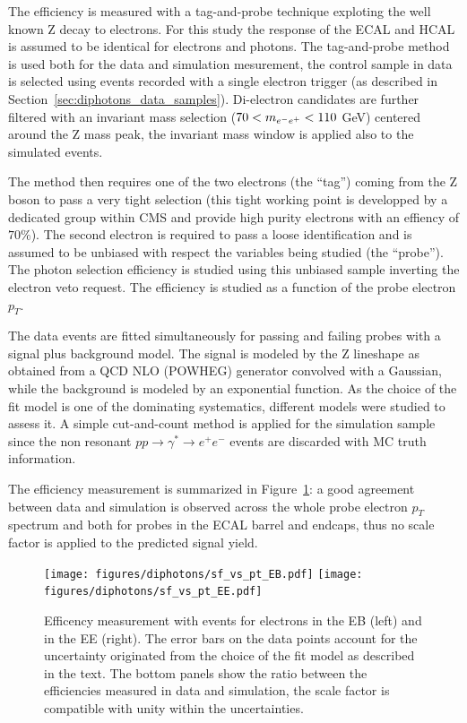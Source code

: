 The efficiency is measured with a tag-and-probe technique exploting the well known Z decay to electrons.
For this study the response of the ECAL and HCAL is assumed to be identical for electrons and photons.
The tag-and-probe method is used both for the data and simulation mesurement, the \Zee control sample
in data is selected using events recorded with a single electron trigger (as described in Section~\ref{sec:diphotons_data_samples}).
Di-electron candidates
are further filtered with an invariant mass selection ($70 < m_{e^-e^+} < 110$ GeV) centered around the Z mass peak,
the invariant mass window is applied also to the simulated events.

The method then requires one of the two electrons (the ``tag'') coming from the Z boson to pass a very tight selection
(this tight working point is developped by a dedicated group within CMS and provide high purity electrons
with an effiency of $70\%$).
The second electron is required to pass a loose identification and is assumed to be unbiased
with respect the variables being studied (the ``probe''). The photon selection efficiency is studied using
this unbiased sample inverting the electron veto request.
The efficiency is studied as a function of the probe electron $p_T$.

The data  events are fitted
simultaneously for passing and failing probes with a signal plus background model.
The signal is modeled by the Z lineshape as obtained from a QCD NLO (POWHEG)
generator convolved with a Gaussian, while the background is modeled by an exponential function. As
the choice of the fit model is one of the dominating systematics, different models were
studied to assess it. A simple cut-and-count method is applied for the simulation sample
since the non resonant $pp \to \gamma^* \to e^+e^-$ events are discarded with MC truth information.

The efficiency measurement is summarized in Figure~\ref{fig:tnp}: a good agreement between data and simulation is
observed across the whole probe electron $p_T$ spectrum and both for probes in the  ECAL barrel and endcaps, thus no scale factor
is applied to the predicted signal yield.

\begin{figure}
  \centering
  \texttt{[image: figures/diphotons/sf\_vs\_pt\_EB.pdf]}
  \texttt{[image: figures/diphotons/sf\_vs\_pt\_EE.pdf]}
  \caption{Efficency measurement with \Zee events for electrons in the EB (left) and in the EE (right).
    The error bars on the data points
    account for the uncertainty originated from the choice of the fit model as described in the text.
    The bottom panels show the ratio between the efficiencies measured in data and simulation, the scale factor is
    compatible with unity within the uncertainties.}
  \label{fig:tnp}    
\end{figure}

